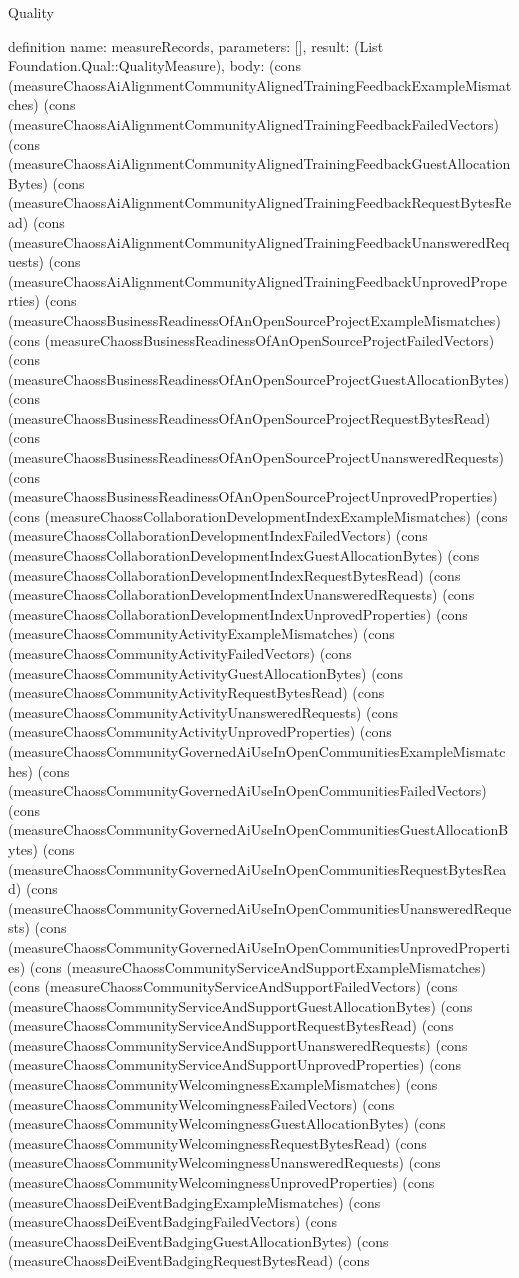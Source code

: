 \begin{lexlean}{Quality}
\begin{semanticmodule}
definition{
  name: measureRecords,
  parameters: [],
  result: (List Foundation.Qual::QualityMeasure),
  body: (cons (measureChaossAiAlignmentCommunityAlignedTrainingFeedbackExampleMismatches) (cons (measureChaossAiAlignmentCommunityAlignedTrainingFeedbackFailedVectors) (cons (measureChaossAiAlignmentCommunityAlignedTrainingFeedbackGuestAllocationBytes) (cons (measureChaossAiAlignmentCommunityAlignedTrainingFeedbackRequestBytesRead) (cons (measureChaossAiAlignmentCommunityAlignedTrainingFeedbackUnansweredRequests) (cons (measureChaossAiAlignmentCommunityAlignedTrainingFeedbackUnprovedProperties) (cons (measureChaossBusinessReadinessOfAnOpenSourceProjectExampleMismatches) (cons (measureChaossBusinessReadinessOfAnOpenSourceProjectFailedVectors) (cons (measureChaossBusinessReadinessOfAnOpenSourceProjectGuestAllocationBytes) (cons (measureChaossBusinessReadinessOfAnOpenSourceProjectRequestBytesRead) (cons (measureChaossBusinessReadinessOfAnOpenSourceProjectUnansweredRequests) (cons (measureChaossBusinessReadinessOfAnOpenSourceProjectUnprovedProperties) (cons (measureChaossCollaborationDevelopmentIndexExampleMismatches) (cons (measureChaossCollaborationDevelopmentIndexFailedVectors) (cons (measureChaossCollaborationDevelopmentIndexGuestAllocationBytes) (cons (measureChaossCollaborationDevelopmentIndexRequestBytesRead) (cons (measureChaossCollaborationDevelopmentIndexUnansweredRequests) (cons (measureChaossCollaborationDevelopmentIndexUnprovedProperties) (cons (measureChaossCommunityActivityExampleMismatches) (cons (measureChaossCommunityActivityFailedVectors) (cons (measureChaossCommunityActivityGuestAllocationBytes) (cons (measureChaossCommunityActivityRequestBytesRead) (cons (measureChaossCommunityActivityUnansweredRequests) (cons (measureChaossCommunityActivityUnprovedProperties) (cons (measureChaossCommunityGovernedAiUseInOpenCommunitiesExampleMismatches) (cons (measureChaossCommunityGovernedAiUseInOpenCommunitiesFailedVectors) (cons (measureChaossCommunityGovernedAiUseInOpenCommunitiesGuestAllocationBytes) (cons (measureChaossCommunityGovernedAiUseInOpenCommunitiesRequestBytesRead) (cons (measureChaossCommunityGovernedAiUseInOpenCommunitiesUnansweredRequests) (cons (measureChaossCommunityGovernedAiUseInOpenCommunitiesUnprovedProperties) (cons (measureChaossCommunityServiceAndSupportExampleMismatches) (cons (measureChaossCommunityServiceAndSupportFailedVectors) (cons (measureChaossCommunityServiceAndSupportGuestAllocationBytes) (cons (measureChaossCommunityServiceAndSupportRequestBytesRead) (cons (measureChaossCommunityServiceAndSupportUnansweredRequests) (cons (measureChaossCommunityServiceAndSupportUnprovedProperties) (cons (measureChaossCommunityWelcomingnessExampleMismatches) (cons (measureChaossCommunityWelcomingnessFailedVectors) (cons (measureChaossCommunityWelcomingnessGuestAllocationBytes) (cons (measureChaossCommunityWelcomingnessRequestBytesRead) (cons (measureChaossCommunityWelcomingnessUnansweredRequests) (cons (measureChaossCommunityWelcomingnessUnprovedProperties) (cons (measureChaossDeiEventBadgingExampleMismatches) (cons (measureChaossDeiEventBadgingFailedVectors) (cons (measureChaossDeiEventBadgingGuestAllocationBytes) (cons (measureChaossDeiEventBadgingRequestBytesRead) (cons }
\end{semanticmodule}
\end{lexlean}
